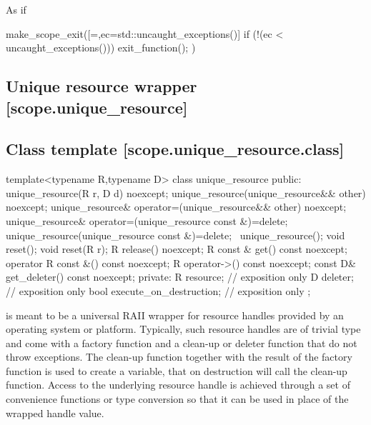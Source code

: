 \documentclass[ebook,11pt,article]{memoir}
\begin{document}
\begin{itemdescr}
\pnum
\returns As if
\begin{codeblock}
  make_scope_exit([=,ec=std::uncaught_exceptions()]
    {
      if (!(ec < uncaught_exceptions())) exit_function();
    })
\end{codeblock}

\end{itemdescr}




\subsection{Unique resource wrapper [scope.unique_resource]}

\subsection {Class template  [scope.unique_resource.class]}

\begin{codeblock}
template<typename R,typename D>
class unique_resource {
public:
  unique_resource(R r, D d) noexcept;
  unique_resource(unique_resource&& other) noexcept;
  unique_resource& operator=(unique_resource&& other) noexcept;
  unique_resource& operator=(unique_resource const &)=delete;
  unique_resource(unique_resource const &)=delete; 
  ~unique_resource();
  void reset();
  void reset(R r);
  R release() noexcept;
  R const & get() const noexcept;
  operator R const &() const noexcept;
  R operator->() const noexcept;
  const D& get_deleter() const noexcept;
private:
  R resource; // exposition only
  D deleter; // exposition only
  bool execute_on_destruction; // exposition only
};
\end{codeblock}

\pnum
\enternote
{} is meant to be a universal RAII wrapper for resource handles provided by an operating system or platform.
Typically, such resource handles are of trivial type and come with a factory function and a clean-up or deleter function that do not throw exceptions.
The clean-up function together with the result of the factory function is used to create a  variable, that on destruction will call the clean-up function. Access to the underlying resource handle is achieved through a set of convenience functions or type conversion so that it can be used in place of the wrapped handle value.
\exitnote
\end{document}
